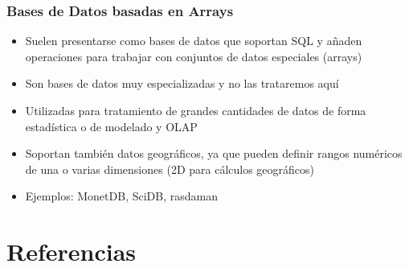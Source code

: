 \documentclass[14pt]{beamer}
\begin{document}
\begin{frame}[allowframebreaks]
  \frametitle{Bases de Datos basadas en Arrays}
  \begin{itemize}
\item Suelen presentarse como bases de datos que soportan SQL y añaden
  operaciones para trabajar con conjuntos de datos especiales (arrays)
\item Son bases de datos muy especializadas y no las trataremos aquí
\item Utilizadas para tratamiento de grandes cantidades de datos de forma
  estadística o de modelado y OLAP
\item Soportan también datos geográficos, ya que pueden definir rangos
  numéricos de una o varias dimensiones (2D para cálculos geográficos)
\item Ejemplos: MonetDB, SciDB, rasdaman
  \end{itemize}
\end{frame}

\section{Referencias}
\end{document}
